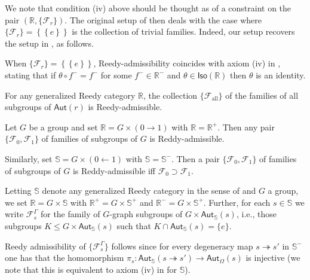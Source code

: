 \documentclass[a4paper,10pt,draft]{article}%
\begin{document}
We note that condition (iv) above should be thought as of a constraint on the pair 
$(\mathbb{R},\{\mathcal{F}_r\})$.
The original setup of \cite{BM11} then deals with the case
where $\{ \mathcal{F}_r \} =
 \left\{ \left\{ e \right\} \right\}$
is the collection of trivial families. Indeed, our setup recovers
the setup in \cite{BM11}, as follows.

\begin{example}
	When $\{ \mathcal{F}_r \} =
 \left\{ \left\{ e \right\} \right\}$, Reedy-admissibility coincides with axiom (iv) in \cite[Def. 1.1]{BM11},
stating that if $\theta \circ f^{-} = f^{-}$
for some $f^- \in \mathbb{R}^{-}$ and 
$\theta \in \mathsf{Iso}(\mathbb{R})$ then $\theta$ is an identity.
\end{example}

\begin{example}
For any generalized Reedy category $\mathbb{R}$, the collection $\{\mathcal{F}_{\text{all}}\}$
of the families of all subgroups of $\mathsf{Aut}(r)$
is Reedy-admissible.
\end{example}

\begin{example}
	Let $G$ be a group and set $\mathbb{R} = G \times (0 \to 1)$ with $\mathbb{R} = \mathbb{R}^+$. Then any pair 
	$\{\mathcal{F}_0,\mathcal{F}_1\}$
	of families of subgroups of $G$ is Reddy-admissible.
	
	Similarly, set $\mathbb{S} = G \times (0 \leftarrow 1)$
	with $\mathbb{S} = \mathbb{S}^-$. Then a pair
	$\{\mathcal{F}_0,\mathcal{F}_1\}$
	of families of subgroups of $G$ is Reddy-admissible
	iff $\mathcal{F}_0 \supset \mathcal{F}_1$.
\end{example}


\begin{example}\label{GGRAPHREEDY EX}
	Letting $\mathbb{S}$ denote any generalized Reedy category in the sense of \cite[Def. 1.1]{BM11} and $G$ a group,
	we set $\mathbb{R} = G \times \mathbb{S}$
	with $\mathbb{R}^+ = G \times \mathbb{S}^+$ and 
	$\mathbb{R}^- = G \times \mathbb{S}^+$.
	Further, for each $s \in \mathbb{S}$ we write
	$\mathcal{F}_s^{\Gamma}$ for the family of 
	$G$-graph subgroups of $G \times \mathsf{Aut}_{\mathbb{S}}(s)$, i.e., those subgroups 
	$K \leq G \times \mathsf{Aut}_{\mathbb{S}}(s)$ such that $K \cap \mathsf{Aut}_{\mathbb{S}}(s) = \{e\}$.
	
	Reedy admissibility of $\{\mathcal{F}_s^{\Gamma}\}$ follows since for every degeneracy map 
	$s \twoheadrightarrow s'$ in $\mathbb{S}^-$ one has that the homomorphism
	$\pi_s \colon \mathsf{Aut}_{\mathbb{S}}(s \twoheadrightarrow s')
	\to \mathsf{Aut}_{\Omega}(s)$ is injective
	(we note that this is equivalent to axiom (iv) in \cite[Def. 1.1]{BM11} for $\mathbb{S}$).
\end{example}
\end{document}

